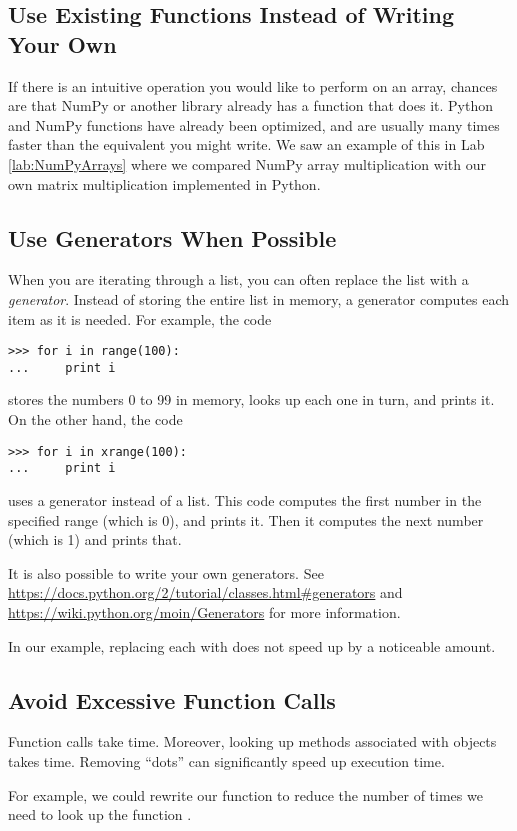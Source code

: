 \subsection*{Use Existing Functions Instead of Writing Your Own}
If there is an intuitive operation you would like to perform on an array, chances are that NumPy or another library already has a function that does it.
Python and NumPy functions have already been optimized, and are usually many times faster than the equivalent you might write.
We saw an example of this in Lab \ref{lab:NumPyArrays} where we compared NumPy array multiplication with our own matrix multiplication implemented in Python.

\subsection*{Use Generators When Possible}
When you are iterating through a list, you can often replace the list with a \emph{generator}.
Instead of storing the entire list in memory, a generator computes each item as it is needed.
For example, the code
\begin{lstlisting}
>>> for i in range(100):
...     print i
\end{lstlisting}
stores the numbers 0 to 99 in memory, looks up each one in turn, and prints it.
On the other hand, the code
\begin{lstlisting}
>>> for i in xrange(100):
...     print i
\end{lstlisting}
uses a generator instead of a list.
This code computes the first number in the specified range (which is 0), and prints it.
Then it computes the next number (which is 1) and prints that.

It is also possible to write your own generators.
See \url{https://docs.python.org/2/tutorial/classes.html#generators} and \url{https://wiki.python.org/moin/Generators} for more information.

In our example, replacing each  with  does not speed up  by a noticeable amount.

\subsection*{Avoid Excessive Function Calls}
Function calls take time.
Moreover, looking up methods associated with objects takes time.
Removing ``dots'' can significantly speed up execution time.

For example, we could rewrite our function to reduce the number of times we need to look up the function .

